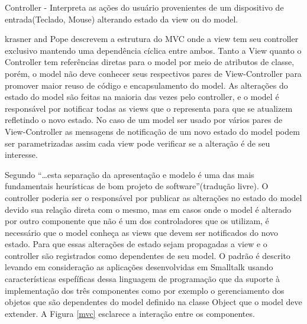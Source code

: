 \documentclass[conference]{IEEEtran}
\begin{document}
Controller - Interpreta as ações do usuário provenientes de um dispositivo de
entrada(Teclado, Mouse) alterando estado da view ou do model.




krasner and Pope \cite{krasnerPope1988} descrevem a estrutura do MVC onde a view
tem seu controller exclusivo mantendo uma dependência cíclica entre ambos. Tanto a View
quanto o Controller tem referências diretas para o model por meio de atributos
de classe, porém, o model não deve conhecer seus respectivos pares de
View-Controller para promover maior reuso de código e encapsulamento do model.
As alterações do estado do model são feitas na maioria das vezes pelo controller, e
o model é responsável por notificar todas as views que o representa para que
se atualizem refletindo o novo estado. No caso de um model ser usado por vários
pares de View-Controller as mensagens de notificação de um novo estado do model
podem ser parametrizadas assim cada view pode verificar se a alteração é de seu
interesse. 

Segundo \cite{Fowler:2002:PEA} ``\ldots esta separação da
apresentação e modelo é uma das mais fundamentais heurísticas de bom projeto
de software''(tradução livre).
O controller poderia ser o responsável por publicar as alterações no estado do
model devido sua relação direta com o mesmo, mas em casos onde o model é
alterado por outro componente que não é um dos controladores que os utilizam, é
necessário que o model conheça as views que devem ser notificados do novo
estado. Para que essas alterações de estado sejam propagadas a view e o
controller são registrados como dependentes de seu model. O padrão é descrito
levando em consideração as aplicações desenvolvidas em Smalltalk usando
características espefíficas dessa linguagem de programação que da suporte à
implementação dos três componentes como por exemplo o gerenciamento dos objetos
que são dependentes do model definido na classe Object que o model deve
extender. A Figura \ref{mvc} esclarece a interação entre os componentes.
\end{document}
